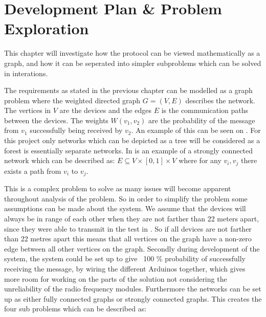\chapter{Development Plan \& Problem Exploration}\label{chp:Problems}
This chapter will investigate how the protocol can be viewed mathematically as a graph, and how it can be seperated into simpler subproblems which can be solved in interations.

\noindent The requirements as stated in the previous chapter can be modelled as a graph problem where the weighted directed graph $G = (V, E)$ describes the network. 
The vertices in $V$ are the devices and the edges $E$ is the communication paths between the devices. 
The weights $W(v_1, v_2)$ are the probability of the message from $v_1$ successfully being received by $v_2$.
An example of this can be seen on .
For this project only networks which can be depicted as a tree will be considered as a forest is essentially separate networks.
In  is an example of a strongly connected network which can be described as: $E \subseteq V \times [0,1] \times V$ where for any $v_i, v_j$ there exists a path from $v_i$ to $v_j$.


\noindent This is a complex problem to solve as many issues will become apparent throughout analysis of the problem.
So in order to simplify the problem some assumptions can be made about the system.
We assume that the devices will always be in range of each other when they are not farther than 22 meters apart, since they were able to transmit in the test in  .
So if all devices are not farther than 22 metres apart this means that all vertices on the graph have a non-zero edge between all other vertices on the graph.
Secondly during development of the system, the system could be set up to give ~100 \% probability of successfully receiving the message, by wiring the different Arduinos together, which gives more room for working on the parts of the solution not considering the unreliability of the radio frequency modules.
Furthermore the networks can be set up as either fully connected graphs or strongly connected graphs.
This creates the four sub problems which can be described as:  %

